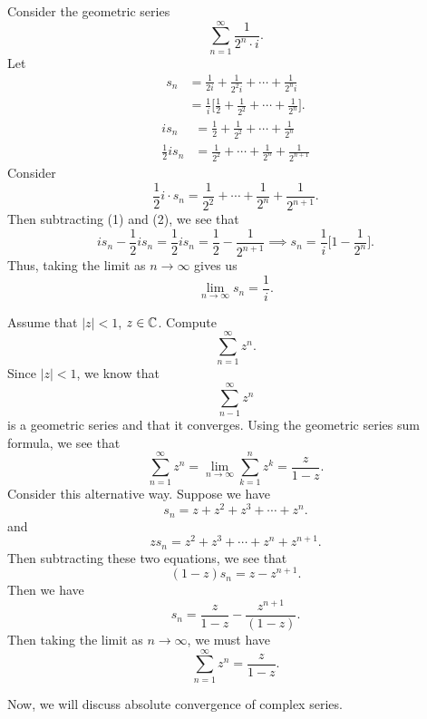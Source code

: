 \documentclass[a4paper]{report}
\begin{document}
\begin{eg}
    Consider the geometric series
    \[  \sum_{ n=1  }^{ \infty  } \frac{ 1  }{ 2^{n} \cdot i  }. \]
    Let 
    \begin{align*}
    {s}_{n} &= \frac{ 1 }{ 2 i  }  + \frac{ 1 }{ 2^{2} i   } + \cdots + \frac{ 1  }{ 2^{n} i  }   \\
            &=  \frac{ 1 }{ i }  \Big[ \frac{ 1 }{ 2 }  + \frac{ 1 }{ 2^{2} }  + \cdots + \frac{ 1 }{ 2^{n} } \Big].
\end{align*}
\begin{align*}
    i {s}_{n} &= \frac{ 1 }{ 2 }  + \frac{ 1 }{ 2^{2}  } + \cdots + \frac{ 1 }{ 2^{n} } \tag{1}  \\
    \frac{ 1 }{ 2 }  i {s}_{n} &= \frac{ 1 }{ 2^{2}  }  + \cdots + \frac{ 1 }{ 2^{n}  } + \frac{ 1 }{ 2^{n+1} } \tag{2}
\end{align*}
Consider
\[  \frac{ 1 }{ 2 }  i \cdot {s}_{n} = \frac{ 1 }{ 2^{2}  }  + \cdots + \frac{ 1 }{ 2^{n} }  + \frac{ 1 }{  2^{n+1} }.  \]
Then subtracting (1) and (2), we see that
\[ i {s}_{n} - \frac{ 1 }{ 2 }  i {s}_{n} =   \frac{ 1 }{ 2 }  i {s}_{n} = \frac{ 1 }{ 2 }  - \frac{ 1 }{ 2^{n+1} } \implies {s}_{n} = \frac{ 1 }{ i }  \Big[ 1 - \frac{ 1 }{ 2^{n} } \Big].   \]
Thus, taking the limit as \( n \to \infty   \) gives us 
\[  \lim_{ n \to \infty  }  {s}_{n} = \frac{ 1 }{ i }. \]
\end{eg}

\begin{eg}
    Assume that \( | z  |  < 1  \), \( z \in \mathbb{C}  \). Compute
    \[  \sum_{ n=1  }^{ \infty   } z^{n}. \]
    Since \( | z  |  < 1  \), we know that 
    \[  \sum_{ n-1  }^{ \infty  } z^{n}   \]
    is a geometric series and that it converges. Using the geometric series sum formula, we see that
    \[  \sum_{ n=1  }^{ \infty  } z^{n} = \lim_{ n \to \infty  }  \sum_{  k =1  }^{ n  } z^{k } = \frac{ z  }{  1 - z }.  \]
    Consider this alternative way. Suppose we have
    \[ {s}_{n} = z + z^{2} + z^{3} + \cdots + z^{n}.    \]
    and
    \[  z {s}_{n} =  z^{2} + z^{3} + \cdots + z^{n} + z^{n+1}.  \]
    Then subtracting these two equations, we see that
    \[  (1 - z ) {s}_{n} = z - z^{n+1}. \]
    Then we have
    \[  {s}_{n} = \frac{ z  }{ 1 - z  } - \frac{ z^{n+1} }{ (1 - z) }.  \]
    Then taking the limit as \( n \to \infty  \), we must have
    \[  \sum_{ n=1  }^{ \infty   } z^{n} = \frac{ z  }{  1 - z  }. \]
\end{eg}

Now, we will discuss absolute convergence of complex series.
\end{document}
